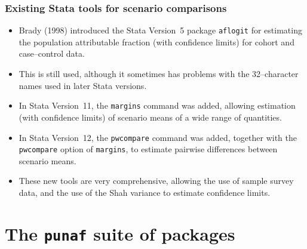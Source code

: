 \documentclass[11pt]{beamer}
\begin{document}
\begin{frame}
\frametitle{Existing Stata tools for scenario comparisons}

\begin{itemize}

\item<2-> Brady (1998)\cite{brady1998} introduced the Stata Version~5 package \texttt{aflogit}
for estimating the population attributable fraction (with confidence limits) for cohort and case--control data.

\item<3-> This is still used, although it sometimes has problems with the 32--character names
used in later Stata versions.

\item<4-> In Stata Version~11, the \texttt{margins} command was added,
allowing estimation (with confidence limits) of scenario means of a wide range of quantities.

\item<5-> In Stata Version~12, the \texttt{pwcompare} command was added,
together with the \texttt{pwcompare} option of \texttt{margins},
to estimate pairwise differences between scenario means.

\item<6-> These new tools are very comprehensive,
allowing the use of sample survey data,
and the use of the Shah variance\cite{shah2004} to estimate confidence limits.

\end{itemize}

\end{frame}

\section{The \texttt{punaf} suite of packages}
\end{document}
